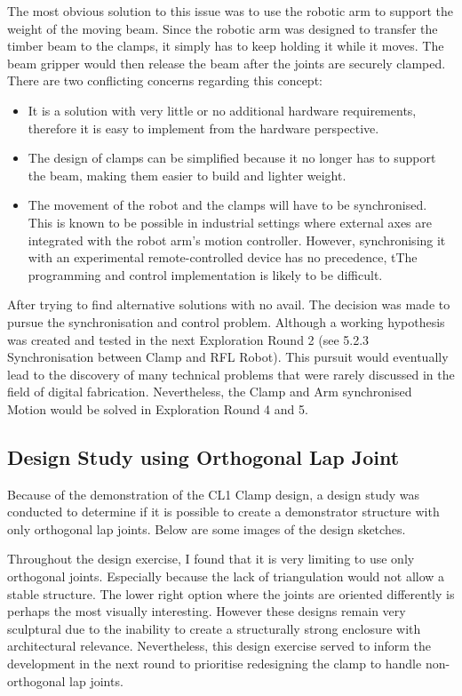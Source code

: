 The most obvious solution to this issue was to use the robotic arm to support the weight of the moving beam. Since the robotic arm was designed to transfer the timber beam to the clamps, it simply has to keep holding it while it moves. The beam gripper would then release the beam after the joints are securely clamped. There are two conflicting concerns regarding this concept:
\begin{itemize}
    \item It is a solution with very little or no additional hardware requirements, therefore it is easy to implement from the hardware perspective.
    \item The design of clamps can be simplified because it no longer has to support the beam, making them easier to build and lighter weight.
    \item The movement of the robot and the clamps will have to be synchronised. This is known to be possible in industrial settings where external axes are integrated with the robot arm’s motion controller. However, synchronising it with an experimental remote-controlled device has no precedence, tThe programming and control implementation is likely to be difficult.
\end{itemize}
After trying to find alternative solutions with no avail. The decision was made to pursue the synchronisation and control problem. Although a working hypothesis was created and tested in the next Exploration Round 2 (see 5.2.3 Synchronisation between Clamp and RFL Robot). This pursuit would eventually lead to the discovery of many technical problems that were rarely discussed in the field of digital fabrication. Nevertheless, the Clamp and Arm synchronised Motion would be solved in Exploration Round 4 and 5.

\subsection{Design Study using Orthogonal Lap Joint}
Because of the demonstration of the CL1 Clamp design, a design study was conducted to determine if it is possible to create a demonstrator structure with only orthogonal lap joints. Below are some images of the design sketches.  


Throughout the design exercise, I found that it is very limiting to use only orthogonal joints. Especially because the lack of triangulation would not allow a stable structure. The lower right option where the joints are oriented differently is perhaps the most visually interesting. However these designs remain very sculptural due to the inability to create a structurally strong enclosure with architectural relevance. 
Nevertheless, this design exercise served to inform the development in the next round to prioritise redesigning the clamp to handle non-orthogonal lap joints.
